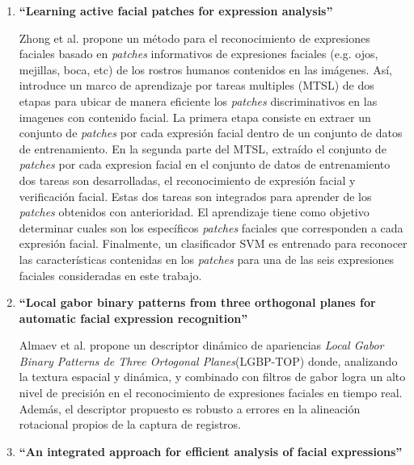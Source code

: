 \begin{enumerate}
\item {\textbf{“Learning active facial patches for expression analysis” \cite{zhong2012learning}}

Zhong et al. propone un método para el reconocimiento de expresiones faciales basado en \textit{patches} informativos de expresiones faciales (e.g. ojos, mejillas, boca, etc) de los rostros humanos contenidos en las imágenes. Así, introduce un marco de aprendizaje por tareas multiples (MTSL) de dos etapas para ubicar de manera eficiente los \textit{patches} discriminativos en las imagenes con contenido facial. La primera etapa consiste en extraer un conjunto de \textit{patches} por cada expresión facial dentro de un conjunto de datos de entrenamiento. En la segunda parte del MTSL, extraído el conjunto  de \textit{patches} por cada expresion facial en el conjunto de datos de entrenamiento dos tareas son desarrolladas, el reconocimiento de expresión facial y verificación facial.  Estas dos tareas son integrados para aprender de los \textit{patches} obtenidos con anterioridad. El aprendizaje tiene como objetivo determinar cuales son los específicos \textit{patches} faciales que corresponden a cada expresión facial. Finalmente, un clasificador SVM es entrenado para reconocer las características contenidas en los \textit{patches} para una de las seis expresiones faciales consideradas en este trabajo. 
}

\item{\textbf{“Local gabor binary patterns from three orthogonal planes for automatic facial expression recognition” \cite{almaev2013local}}

Almaev et al.  propone un descriptor dinámico de apariencias \textit{Local Gabor Binary Patterns de Three Ortogonal Planes}(LGBP-TOP) donde, analizando la textura espacial y dinámica, y combinado con filtros de gabor logra un alto nivel de precisión en el reconocimiento de expresiones faciales en tiempo real. Además, el descriptor propuesto es robusto a errores en la alineación rotacional propios de la captura de registros.
}

\item{\textbf{“An integrated approach for efficient analysis of facial expressions” \cite{ghayoumi2014integrated}}

}
\end{enumerate}
